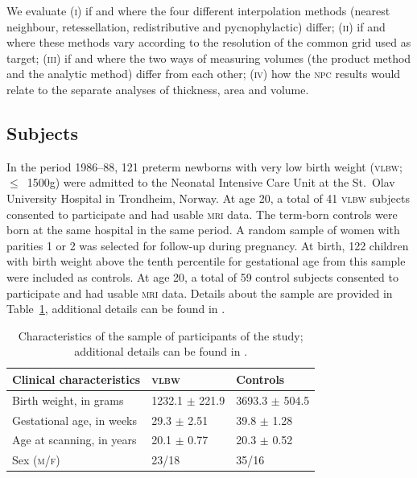 We evaluate (\textsc{i}) if and where the four different interpolation methods (nearest neighbour, retessellation, redistributive and pycnophylactic) differ; (\textsc{ii}) if and where these methods vary according to the resolution of the common grid used as target; (\textsc{iii}) if and where the two ways of measuring volumes (the product method and the analytic method) differ from each other; (\textsc{iv}) how the \textsc{npc} results would relate to the separate analyses of thickness, area and volume.

\subsection{Subjects}

In the period 1986--88, 121 preterm newborns with very low birth weight (\textsc{vlbw}; $\leqslant$~1500g) were admitted to the Neonatal Intensive Care Unit at the St.\ Olav University Hospital in Trondheim, Norway. At age 20, a total of 41 \textsc{vlbw} subjects consented to participate and had usable \textsc{mri} data. The term-born controls were born at the same hospital in the same period. A random sample of women with parities 1 or 2 was selected for follow-up during pregnancy. At birth, 122 children with birth weight above the tenth percentile for gestational age from this sample were included as controls. At age 20, a total of 59 control subjects consented to participate and had usable \textsc{mri} data. Details about the sample are provided in Table~\ref{tab:sample}, additional details can be found in \citet{Martinussen2005, Skranes2007}.

\begin{table}[!tp]
\caption[Details about the sample.]{Characteristics of the sample of participants of the study; additional details can be found in \citet{Martinussen2005, Skranes2007}.}
\begin{center}
\hspace*{-0mm}\begin{tabular}{@{}lll@{}}
\toprule
Clinical characteristics & \textsc{vlbw} & Controls\\
\midrule
Birth weight, in grams    & 1232.1 $\pm$ 221.9 & 3693.3 $\pm$ 504.5 \\
Gestational age, in weeks & 29.3 $\pm$ 2.51 & 39.8 $\pm$ 1.28 \\
Age at scanning, in years & 20.1 $\pm$ 0.77 & 20.3 $\pm$ 0.52 \\
Sex (\textsc{m/f})        & 23/18 & 35/16 \\
\bottomrule   
\end{tabular}
\end{center}
\label{tab:sample}
\end{table}

